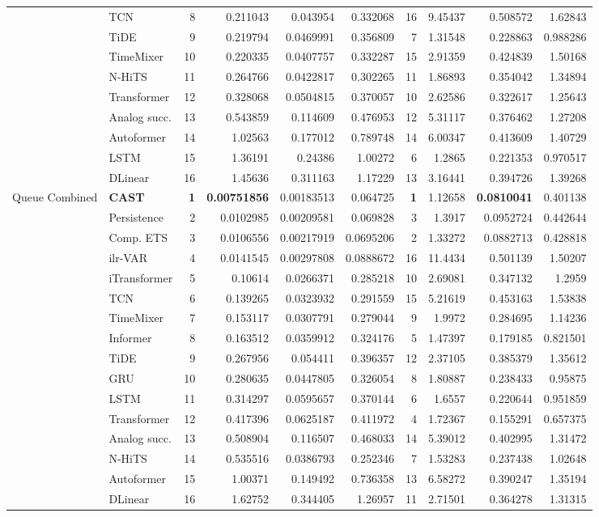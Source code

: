 \begin{longtable}{@{}llrrrrrrrr@{}}
 & TCN & 8 & 0.211043 & 0.043954 & 0.332068 & 16 & 9.45437 & 0.508572 & 1.62843 \\
 & TiDE & 9 & 0.219794 & 0.0469991 & 0.356809 & 7 & 1.31548 & 0.228863 & 0.988286 \\
 & TimeMixer & 10 & 0.220335 & 0.0407757 & 0.332287 & 15 & 2.91359 & 0.424839 & 1.50168 \\
 & N-HiTS & 11 & 0.264766 & 0.0422817 & 0.302265 & 11 & 1.86893 & 0.354042 & 1.34894 \\
 & Transformer & 12 & 0.328068 & 0.0504815 & 0.370057 & 10 & 2.62586 & 0.322617 & 1.25643 \\
 & Analog succ. & 13 & 0.543859 & 0.114609 & 0.476953 & 12 & 5.31117 & 0.376462 & 1.27208 \\
 & Autoformer & 14 & 1.02563 & 0.177012 & 0.789748 & 14 & 6.00347 & 0.413609 & 1.40729 \\
 & LSTM & 15 & 1.36191 & 0.24386 & 1.00272 & 6 & 1.2865 & 0.221353 & 0.970517 \\
 & DLinear & 16 & 1.45636 & 0.311163 & 1.17229 & 13 & 3.16441 & 0.394726 & 1.39268 \\
\addlinespace
Queue Combined & \textbf{CAST} & \textbf{1} & \textbf{0.00751856} & 0.00183513 & 0.064725 & \textbf{1} & 1.12658 & \textbf{0.0810041} & 0.401138 \\
 & Persistence & 2 & 0.0102985 & 0.00209581 & 0.069828 & 3 & 1.3917 & 0.0952724 & 0.442644 \\
 & Comp. ETS & 3 & 0.0106556 & 0.00217919 & 0.0695206 & 2 & 1.33272 & 0.0882713 & 0.428818 \\
 & ilr-VAR & 4 & 0.0141545 & 0.00297808 & 0.0888672 & 16 & 11.4434 & 0.501139 & 1.50207 \\
 & iTransformer & 5 & 0.10614 & 0.0266371 & 0.285218 & 10 & 2.69081 & 0.347132 & 1.2959 \\
 & TCN & 6 & 0.139265 & 0.0323932 & 0.291559 & 15 & 5.21619 & 0.453163 & 1.53838 \\
 & TimeMixer & 7 & 0.153117 & 0.0307791 & 0.279044 & 9 & 1.9972 & 0.284695 & 1.14236 \\
 & Informer & 8 & 0.163512 & 0.0359912 & 0.324176 & 5 & 1.47397 & 0.179185 & 0.821501 \\
 & TiDE & 9 & 0.267956 & 0.054411 & 0.396357 & 12 & 2.37105 & 0.385379 & 1.35612 \\
 & GRU & 10 & 0.280635 & 0.0447805 & 0.326054 & 8 & 1.80887 & 0.238433 & 0.95875 \\
 & LSTM & 11 & 0.314297 & 0.0595657 & 0.370144 & 6 & 1.6557 & 0.220644 & 0.951859 \\
 & Transformer & 12 & 0.417396 & 0.0625187 & 0.411972 & 4 & 1.72367 & 0.155291 & 0.657375 \\
 & Analog succ. & 13 & 0.508904 & 0.116507 & 0.468033 & 14 & 5.39012 & 0.402995 & 1.31472 \\
 & N-HiTS & 14 & 0.535516 & 0.0386793 & 0.252346 & 7 & 1.53283 & 0.237438 & 1.02648 \\
 & Autoformer & 15 & 1.00371 & 0.149492 & 0.736358 & 13 & 6.58272 & 0.390247 & 1.35194 \\
 & DLinear & 16 & 1.62752 & 0.344405 & 1.26957 & 11 & 2.71501 & 0.364278 & 1.31315 \\
\bottomrule
\end{longtable}
\endgroup
